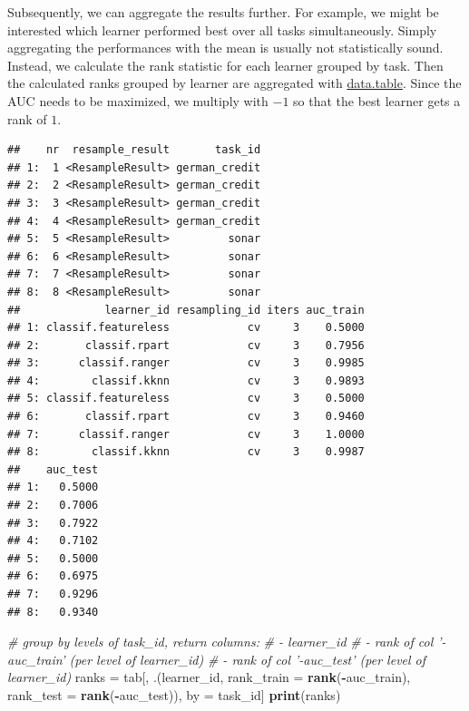 \documentclass[]{article}
\newenvironment{Shaded}{\begin{snugshade}}{\end{snugshade}}
\newcommand{\CommentTok}[1]{\textcolor[rgb]{0.56,0.35,0.01}{\textit{#1}}}
\newcommand{\DataTypeTok}[1]{\textcolor[rgb]{0.13,0.29,0.53}{#1}}
\newcommand{\KeywordTok}[1]{\textcolor[rgb]{0.13,0.29,0.53}{\textbf{#1}}}
\newcommand{\NormalTok}[1]{#1}
\newcommand{\OperatorTok}[1]{\textcolor[rgb]{0.81,0.36,0.00}{\textbf{#1}}}
\newcommand{\StringTok}[1]{\textcolor[rgb]{0.31,0.60,0.02}{#1}}
\renewenvironment{Shaded} {\begin{snugshade}\small} {\end{snugshade}}
\begin{document}
Subsequently, we can aggregate the results further.
For example, we might be interested which learner performed best over all tasks simultaneously.
Simply aggregating the performances with the mean is usually not statistically sound.
Instead, we calculate the rank statistic for each learner grouped by task.
Then the calculated ranks grouped by learner are aggregated with \href{https://cran.r-project.org/package=data.table}{data.table}.
Since the AUC needs to be maximized, we multiply with \(-1\) so that the best learner gets a rank of \(1\).

\begin{Shaded}
\end{Shaded}

\begin{verbatim}
##    nr  resample_result       task_id
## 1:  1 <ResampleResult> german_credit
## 2:  2 <ResampleResult> german_credit
## 3:  3 <ResampleResult> german_credit
## 4:  4 <ResampleResult> german_credit
## 5:  5 <ResampleResult>         sonar
## 6:  6 <ResampleResult>         sonar
## 7:  7 <ResampleResult>         sonar
## 8:  8 <ResampleResult>         sonar
##             learner_id resampling_id iters auc_train
## 1: classif.featureless            cv     3    0.5000
## 2:       classif.rpart            cv     3    0.7956
## 3:      classif.ranger            cv     3    0.9985
## 4:        classif.kknn            cv     3    0.9893
## 5: classif.featureless            cv     3    0.5000
## 6:       classif.rpart            cv     3    0.9460
## 7:      classif.ranger            cv     3    1.0000
## 8:        classif.kknn            cv     3    0.9987
##    auc_test
## 1:   0.5000
## 2:   0.7006
## 3:   0.7922
## 4:   0.7102
## 5:   0.5000
## 6:   0.6975
## 7:   0.9296
## 8:   0.9340
\end{verbatim}

\begin{Shaded}
\begin{Highlighting}[]
\CommentTok{# group by levels of task_id, return columns:}
\CommentTok{# - learner_id}
\CommentTok{# - rank of col '-auc_train' (per level of learner_id)}
\CommentTok{# - rank of col '-auc_test' (per level of learner_id)}
\NormalTok{ranks =}\StringTok{ }\NormalTok{tab[, .(learner_id, }\DataTypeTok{rank_train =} \KeywordTok{rank}\NormalTok{(}\OperatorTok{-}\NormalTok{auc_train), }\DataTypeTok{rank_test =} \KeywordTok{rank}\NormalTok{(}\OperatorTok{-}\NormalTok{auc_test)), by =}\StringTok{ }\NormalTok{task_id]}
\KeywordTok{print}\NormalTok{(ranks)}
\end{Highlighting}
\end{Shaded}
\end{document}
